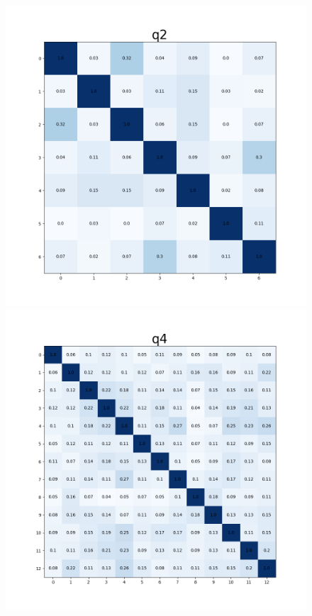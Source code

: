 \begin{figure}[!h]
\begin{minipage}[t]{.5\textwidth}
\centering
\includegraphics[width=\textwidth]{figuras/hmq2.png} 
\end{minipage}%
\begin{minipage}[t]{.5\textwidth}
\centering
\includegraphics[width=\textwidth]{figuras/hmq4.png}

\end{minipage}
\end{figure}
